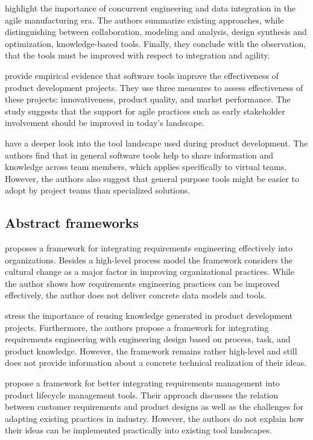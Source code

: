 \cite{buyukozkan2004survey} highlight the importance of concurrent engineering and data integration in the agile manufacturing era.
The authors summarize existing approaches, while distinguishing between collaboration, modeling and analysis, design synthesis and optimization, knowledge-based tools.
Finally, they conclude with the observation, that the tools must be improved with respect to integration and agility.

\cite{DURMUSOGLU2011321} provide empirical evidence that software tools improve the effectiveness of product development projects.
They use three measures to assess effectiveness of these projects: innovativeness, product quality, and market performance.
The study suggests that the support for agile practices such as early stakeholder involvement should be improved in today's landscape.

\cite{marion_fixson_2019} have a deeper look into the tool landscape used during product development.
The authors find that in general software tools help to share information and knowledge across team members, which applies specifically to virtual teams.
However, the authors also suggest that general purpose tools might be easier to adopt by project teams than specialized solutions.

\subsection{Abstract frameworks}

\cite{Kauppinen2005} proposes a framework for integrating requirements engineering effectively into organizations.
Besides a high-level process model the framework considers the cultural change as a major factor in improving organizational practices.
While the author shows how requirements engineering practices can be improved effectively, the author does not deliver concrete data models and tools.

\cite{BAXTER2008585} stress the importance of reusing knowledge generated in product development projects.
Furthermore, the authors propose a framework for integrating requirements engineering with engineering design based on process, task, and product knowledge.
However, the framework remains rather high-level and still does not provide information about a concrete technical realization of their ideas.

\cite{Jorma2014} propose a framework for better integrating requirements management into product lifecycle management tools.
Their approach discusses the relation between customer requirements and product designs as well as the challenges for adapting existing practices in industry.
However, the authors do not explain how their ideas can be implemented practically into existing tool landscapes.

